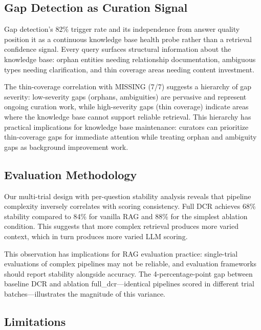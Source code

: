 \documentclass[11pt,a4paper]{article}
\begin{document}
\subsection{Gap Detection as Curation Signal}

Gap detection's 82\% trigger rate and its independence from answer quality position it as a continuous knowledge base health probe rather than a retrieval confidence signal. Every query surfaces structural information about the knowledge base: orphan entities needing relationship documentation, ambiguous types needing clarification, and thin coverage areas needing content investment.

The thin-coverage correlation with MISSING (7/7) suggests a hierarchy of gap severity: low-severity gaps (orphans, ambiguities) are pervasive and represent ongoing curation work, while high-severity gaps (thin coverage) indicate areas where the knowledge base cannot support reliable retrieval. This hierarchy has practical implications for knowledge base maintenance: curators can prioritize thin-coverage gaps for immediate attention while treating orphan and ambiguity gaps as background improvement work.

\subsection{Evaluation Methodology}

Our multi-trial design with per-question stability analysis reveals that pipeline complexity inversely correlates with scoring consistency. Full DCR achieves 68\% stability compared to 84\% for vanilla RAG and 88\% for the simplest ablation condition. This suggests that more complex retrieval produces more varied context, which in turn produces more varied LLM scoring.

This observation has implications for RAG evaluation practice: single-trial evaluations of complex pipelines may not be reliable, and evaluation frameworks should report stability alongside accuracy. The 4-percentage-point gap between baseline DCR and ablation full\_dcr---identical pipelines scored in different trial batches---illustrates the magnitude of this variance.

\subsection{Limitations}
\end{document}
